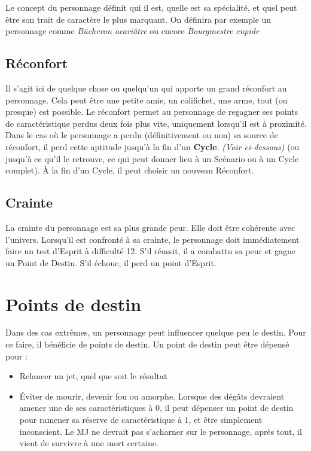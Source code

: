 \documentclass[a4paper,10pt,twoside,twocolumn,openany,bg=print,justified]{dndbook}
\begin{document}
Le concept du personnage définit qui il est, quelle est sa spécialité, et quel peut être son trait de caractère le plus marquant. On définira par exemple un personnage comme \emph{Bûcheron acariâtre} ou encore \emph{Bourgmestre cupide}

\subsection*{Réconfort}

Il s'agit ici de quelque chose ou quelqu'un qui apporte un grand réconfort au personnage. Cela peut être une petite amie, un colifichet, une arme, tout (ou presque) est possible. Le réconfort permet au personnage de regagner ses points de caractéristique perdus deux fois plus vite, uniquement lorsqu'il est à proximité. Dans le cas où le personnage a perdu (définitivement ou non) sa source de réconfort, il perd cette aptitude jusqu'à la fin d'un \textbf{Cycle}. \emph{(Voir ci-dessous)} (ou jusqu'à ce qu'il le retrouve, ce qui peut donner lieu à un Scénario ou à un Cycle complet). À la fin d'un Cycle, il peut choisir un nouveau Réconfort.

\subsection*{Crainte}

La crainte du personnage est sa plus grande peur. Elle doit être cohérente avec l'univers. Lorsqu'il est confronté à sa crainte, le personnage doit immédiatement faire un test d'Esprit à difficulté 12. S'il réussit, il a combattu sa peur et gagne un Point de Destin. S'il échoue, il perd un point d'Esprit.

\section{Points de destin}

Dans des cas extrêmes, un personnage peut influencer quelque peu le destin. Pour ce faire, il bénéficie de points de destin. Un point de destin peut être dépensé pour :

\begin{itemize}
	\item Relancer un jet, quel que soit le résultat
	\item Éviter de mourir, devenir fou ou amorphe. Lorsque des dégâts devraient amener une de ses caractéristiques à 0, il peut dépenser un point de destin pour ramener sa réserve de caractéristique à 1, et être simplement inconscient. Le MJ ne devrait pas s'acharner sur le personnage, après tout, il vient de survivre à une mort certaine.
\end{itemize}
\end{document}
